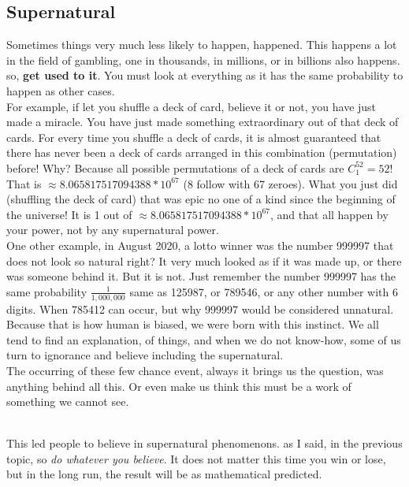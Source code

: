 \documentclass{article}
\begin{document}
\subsection{Supernatural}
Sometimes things very much less likely to happen, happened.  This happens a lot in the field of gambling, one in thousands, in millions, or in billions also happens. so, \textbf{get used to it}.  You must look at everything as it has the same probability to happen as other cases. \\

For example, if let you shuffle a deck of card, believe it or not, you have just made a miracle.  You have just made something extraordinary out of that deck of cards. For every time you shuffle a deck of cards, it is almost guaranteed that there has never been a deck of cards arranged in this combination (permutation) before! Why? Because all possible permutations of a deck of cards are $C_1^{52}=52!$ That is $\approx8.065817517094388 * 10^{67}$ (8 follow with 67 zeroes).  What you just did (shuffling the deck of card) that was epic no one of a kind since the beginning of the universe!  It is 1 out of $\approx8.065817517094388 * 10^{67}$, and that all happen by your power, not by any supernatural power.\\

One other example, in August 2020, a lotto winner was the number 999997 that does not look so natural right?  It very much looked as if it was made up, or there was someone behind it.  But it is not.  Just remember the number 999997 has the same probability $\frac{1}{1,000,000}$ same as 125987, or 789546, or any other number with 6 digits. When 785412 can occur, but why 999997 would be considered unnatural.  Because that is how human is biased, we were born with this instinct.  We all tend to find an explanation, of things, and when we do not know-how, some of us turn to ignorance and believe including the supernatural.\\

The occurring of these few chance event, always it brings us the question, was anything behind all this. Or even make us think this must be a work of something we cannot see.  \\\

This led people to believe in supernatural phenomenons. as I said, in the previous topic, so \emph{do whatever you believe}.  It does not matter this time you win or lose, but in the long run, the result will be as mathematical predicted.\\
\end{document}
